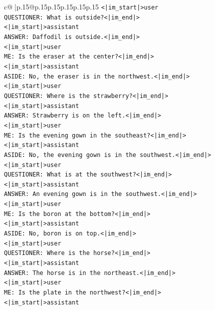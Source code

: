 \documentclass{article}
\begin{document}
{\begin{supertabular}{c@{$\;$}|p{.15\linewidth}@{}p{.15\linewidth}p{.15\linewidth}p{.15\linewidth}p{.15\linewidth}p{.15\linewidth}}
{{{\texttt{<|im\_start|>user} \\
\texttt{QUESTIONER: What is outside?<|im\_end|>} \\
\texttt{<|im\_start|>assistant} \\
\texttt{ANSWER: Daffodil is outside.<|im\_end|>} \\
\texttt{<|im\_start|>user} \\
\texttt{ME: Is the eraser at the center?<|im\_end|>} \\
\texttt{<|im\_start|>assistant} \\
\texttt{ASIDE: No, the eraser is in the northwest.<|im\_end|>} \\
\texttt{<|im\_start|>user} \\
\texttt{QUESTIONER: Where is the strawberry?<|im\_end|>} \\
\texttt{<|im\_start|>assistant} \\
\texttt{ANSWER: Strawberry is on the left.<|im\_end|>} \\
\texttt{<|im\_start|>user} \\
\texttt{ME: Is the evening gown in the southeast?<|im\_end|>} \\
\texttt{<|im\_start|>assistant} \\
\texttt{ASIDE: No, the evening gown is in the southwest.<|im\_end|>} \\
\texttt{<|im\_start|>user} \\
\texttt{QUESTIONER: What is at the southwest?<|im\_end|>} \\
\texttt{<|im\_start|>assistant} \\
\texttt{ANSWER: An evening gown is in the southwest.<|im\_end|>} \\
\texttt{<|im\_start|>user} \\
\texttt{ME: Is the boron at the bottom?<|im\_end|>} \\
\texttt{<|im\_start|>assistant} \\
\texttt{ASIDE: No, boron is on top.<|im\_end|>} \\
\texttt{<|im\_start|>user} \\
\texttt{QUESTIONER: Where is the horse?<|im\_end|>} \\
\texttt{<|im\_start|>assistant} \\
\texttt{ANSWER: The horse is in the northeast.<|im\_end|>} \\
\texttt{<|im\_start|>user} \\
\texttt{ME: Is the plate in the northwest?<|im\_end|>} \\
\texttt{<|im\_start|>assistant} \\
}}}
\end{supertabular}}
\end{document}
